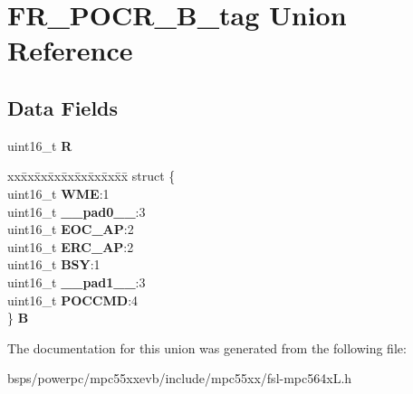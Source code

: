 \hypertarget{unionFR__POCR__16B__tag}{}\section{F\+R\+\_\+\+P\+O\+C\+R\+\_\+B\+\_\+tag Union Reference}
\label{unionFR__POCR__16B__tag}
\subsection*{Data Fields}
\begin{DoxyCompactItemize}
\item 
\mbox{\label{unionFR__POCR__16B__tag_a71c7f82d13e3dffa4d74bd9ad55cb65a}} 
uint16\+\_\+t {\bfseries R}
\item 
\mbox{\label{unionFR__POCR__16B__tag_ae065063c799f6bcd70f68d1d33ca22cd}} 
\begin{tabbing}
xx\=xx\=xx\=xx\=xx\=xx\=xx\=xx\=xx\=\kill
struct \{\\
\>uint16\_t {\bfseries WME}:1\\
\>uint16\_t {\bfseries \_\_pad0\_\_}:3\\
\>uint16\_t {\bfseries EOC\_AP}:2\\
\>uint16\_t {\bfseries ERC\_AP}:2\\
\>uint16\_t {\bfseries BSY}:1\\
\>uint16\_t {\bfseries \_\_pad1\_\_}:3\\
\>uint16\_t {\bfseries POCCMD}:4\\
\} {\bfseries B}\\

\end{tabbing}\end{DoxyCompactItemize}


The documentation for this union was generated from the following file\+:\begin{DoxyCompactItemize}
\item 
bsps/powerpc/mpc55xxevb/include/mpc55xx/fsl-\/mpc564x\+L.\+h\end{DoxyCompactItemize}
